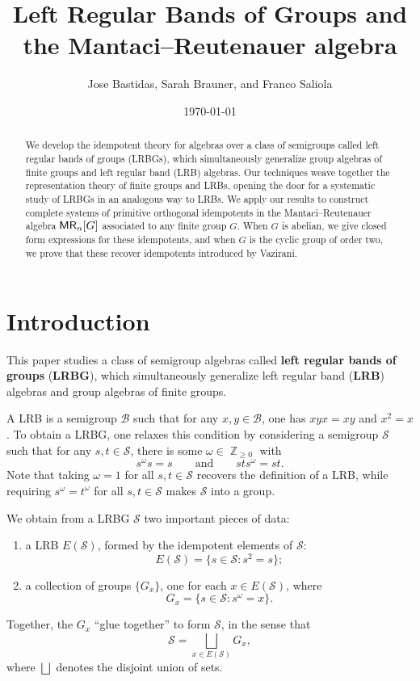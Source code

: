 \documentclass[11pt, oneside, reqno]{amsart}
\date{\today}
\title[Left Regular Bands of Groups and the Mantaci--Reutenauer algebra]{Left Regular Bands of Groups and \\ the Mantaci--Reutenauer algebra}
\author{Jose Bastidas, Sarah Brauner, and Franco Saliola}
\theoremstyle{definition}
\numberwithin{equation}{section}
\DeclareMathOperator{\Z}{\mathbb{Z}}
\newcommand{\defn}[1]{{\color{RoyalBlue}\bf#1}}
\def \BB{{\mathcal{B}}}
\def \MR {{\sf{MR}}}
\def \SS{{\mathcal{S}}}
\def\qqand{\qquad\text{and}\qquad}
\begin{document}
\begin{abstract}
We develop the idempotent theory for algebras over a class of semigroups called
left regular bands of groups (LRBGs), which simultaneously generalize group
algebras of finite groups and left regular band (LRB) algebras.  Our techniques
weave together the representation theory of finite groups and
LRBs, opening the door for a systematic study of LRBGs in an
analogous way to LRBs. We apply our results to construct complete systems of
primitive orthogonal idempotents in the Mantaci--Reutenauer algebra $\MR_n[G]$
associated to any finite group $G$. When $G$ is abelian, we give closed form
expressions for these idempotents, and when $G$ is the cyclic group of order
two, we prove that these recover idempotents introduced by Vazirani.
\end{abstract}
\maketitle

\section{Introduction}
This paper studies a class of semigroup algebras called \defn{left regular
bands of groups} (\defn{LRBG}), which simultaneously generalize left
regular band (\defn{LRB}) algebras and group algebras of finite groups. 

A LRB is a semigroup $\BB$ such that for any $x,y \in \BB$, one has $xyx= xy$ and $x^2 = x$. To obtain a LRBG, one relaxes this condition by considering a semigroup $\SS$ such that for any $s,t \in \SS$, there is some $\omega \in \Z_{\geq 0}$ with
\[ s^{\omega}s = s \qqand st s^{\omega} = st.\]
Note that taking $\omega = 1$ for all $s,t \in \SS$ recovers the definition of a LRB, while requiring $s^{\omega} = t^{\omega} $ for all $s,t \in \SS$ makes $\SS$ into a group. 

We obtain from a LRBG $\SS$ two important pieces of data:
\begin{enumerate}
    \item a LRB $E(\SS)$, formed by the idempotent elements of $\SS$:
    \[ E(\SS)= \{ s \in \SS: s^2 = s \};\]
    \item a collection of groups $\{ G_{x} \}$, one for each $x \in E(\SS)$, where 
    \[G_x = \{ s \in \SS : s^\omega = x \}. \]
\end{enumerate}
Together, the $G_x$ ``glue together'' to form $\SS$, in the sense that 
\[
    \SS = \bigsqcup_{x \in E(\SS)} G_x,
\]
where $\bigsqcup$ denotes the disjoint union of sets.
\end{document}
